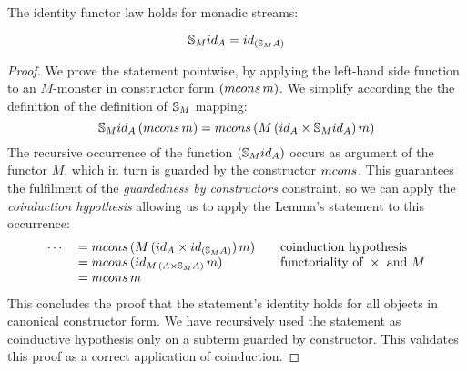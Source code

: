 \begin{lemma}\label{lemma:functor_id}
The identity functor law holds for monadic streams:

$$
\stream{M} \id_A = \id_{(\stream{M} A)}
$$

\end{lemma}
\begin{proof}
We prove the statement pointwise, by applying the left-hand side function to an $M$-monster in constructor form $(\mcons\,m)$.
We simplify according the the definition of the definition of $\mathbb{S}_{M}$ mapping:
$$
\stream{M} \id_A\,(\mcons\,m)
= \mcons\,(M\,(\id_A\times \stream{M} \id_A)\,m)
$$
The recursive occurrence of the function $(\stream{M} \id_A)$ occurs as argument of the functor $M$, which in turn is guarded by the constructor $\mcons$.
This guarantees the fulfilment of the {\em guardedness by constructors} constraint, so we can apply the {\em coinduction hypothesis} allowing us to apply the Lemma's statement to this occurrence:
$$
\begin{array}{rl@{\qquad}l}
\cdots
& {}= \mcons\,(M\,(\id_A\times \id_{(\stream{M} A)})\,m)
  & \mbox{coinduction hypothesis}\\
& {}= \mcons\,(\id_{M\,(A\times \stream{M} A)}\,m)
  & \mbox{functoriality of }\times\mbox{ and }M\\
& {}= \mcons\,m
\end{array}
$$
This concludes the proof that the statement's identity holds for all objects in canonical constructor form.
We have recursively used the statement as coinductive hypothesis only on a subterm guarded by constructor.
This validates this proof as a correct application of coinduction.
\end{proof}

